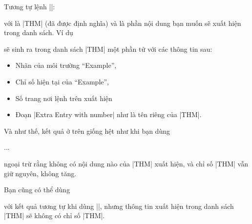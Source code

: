 \begin{theorem}
\begin{thm}
\begin{dinhly}
\begin{dinhly*}
\medskip
\DescribeMacro\addtheoremline
Tương tự lệnh |\addtocontentsline|:
\begin{command}
\end{command}
với  là |THM| (đã được định nghĩa) và 
là phần nội dung bạn muốn sẽ xuất hiện trong danh sách. Ví dụ
\begin{example}
\end{example}
sẽ sinh ra trong danh sách |THM| một phần tử với các thông tin sau:
\begin{itemize}
\item Nhãn của môi trường ``Example'',
\item Chỉ số hiện tại của ``Example'',
\item Số trang nơi lệnh trên xuất hiện
\item Đoạn |Extra Entry with number| như là tên riêng của |THM|.
\end{itemize}
Và như thế, kết quả ở trên giống hệt như khi bạn dùng
\begin{example}
  \begin{Example}
  ...
  \end{Example}
\end{example}
ngoại trừ rằng không có nội dung nào của |THM| xuất hiện, và chỉ số
|THM| vẫn giữ nguyên, không tăng.

\medskip
\DescribeMacro{\addtheoremline*}
Bạn cũng có thể dùng
\begin{command}
\end{command}
với kết quả tương tự khi dùng |\addtheoremline|, nhưng
thông tin xuất hiện trong danh sách |THM| sẽ không có chỉ số |THM|.


\end{dinhly*}
\end{dinhly}
\end{thm}
\end{theorem}
